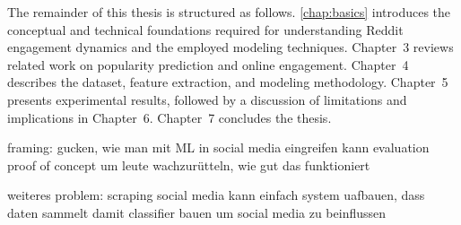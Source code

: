 
The remainder of this thesis is structured as follows. \autoref{chap:basics} introduces the conceptual and technical foundations required for understanding Reddit engagement dynamics and the employed modeling techniques. Chapter~3 reviews related work on popularity prediction and online engagement. Chapter~4 describes the dataset, feature extraction, and modeling methodology. Chapter~5 presents experimental results, followed by a discussion of limitations and implications in Chapter~6. Chapter~7 concludes the thesis.





framing: gucken, wie man mit ML in social media eingreifen kann
evaluation proof of concept um leute wachzurütteln, wie gut das funktioniert

weiteres problem: scraping social media 
kann einfach system uafbauen, dass daten sammelt
damit classifier bauen um social media zu beinflussen
